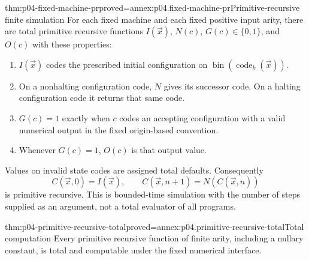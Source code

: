 \begin{hblemma}{thm:p04-fixed-machine-pr}{proved=annex:p04.fixed-machine-pr}{Primitive-recursive finite simulation}
For each fixed machine and each fixed positive input arity, there are
total primitive recursive functions \(I(\vec x)\), \(N(c)\),
\(G(c)\in\{0,1\}\), and \(O(c)\) with these properties:
\begin{enumerate}
 \item \(I(\vec x)\) codes the prescribed initial configuration on
       \(\operatorname{bin}(\operatorname{code}_k(\vec x))\).
 \item On a nonhalting configuration code, \(N\) gives its successor
       code. On a halting configuration code it returns that same code.
 \item \(G(c)=1\) exactly when \(c\) codes an accepting configuration
       with a valid numerical output in the fixed origin-based convention.
 \item Whenever \(G(c)=1\), \(O(c)\) is that output value.
\end{enumerate}
Values on invalid state codes are assigned total defaults. Consequently
\[
 C(\vec x,0)=I(\vec x),\qquad
 C(\vec x,n+1)=N(C(\vec x,n))
\]
is primitive recursive. This is bounded-time simulation with the number
of steps supplied as an argument, not a total evaluator of all programs.
\end{hblemma}

\begin{hbcorollary}{thm:p04-primitive-recursive-total}{proved=annex:p04.primitive-recursive-total}{Total computation}
Every primitive recursive function of finite arity, including a nullary
constant, is total and computable under the fixed numerical interface.
\end{hbcorollary}
